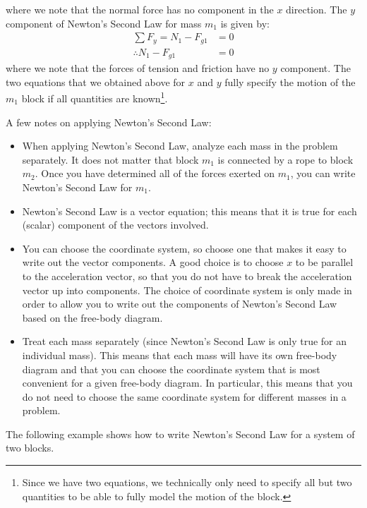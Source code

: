 where we note that the normal force has no component in the $x$ direction. The $y$ component of Newton's Second Law for mass $m_1$ is given by:
\begin{align*}
\sum F_y = N_1-F_{g1}&=0\\
\therefore N_1-F_{g1}&=0
\end{align*}
where we note that the forces of tension and friction have no $y$ component. The two equations that we obtained above for $x$ and $y$ fully specify the motion of the $m_1$ block if all quantities are known\footnote{Since we have two equations, we technically only need to specify all but two quantities to be able to fully model the motion of the block.}.

A few notes on applying Newton's Second Law:
\begin{itemize}
\item When applying Newton's Second Law, analyze each mass in the problem separately. It does not matter that block $m_1$ is connected by a rope to block $m_2$. Once you have determined all of the forces exerted on $m_1$, you can write Newton's Second Law for $m_1$.
\item Newton's Second Law is a vector equation; this means that it is true for each (scalar) component of the vectors involved.
\item You can choose the coordinate system, so choose one that makes it easy to write out the vector components. A good choice is to choose $x$ to be parallel to the acceleration vector, so that you do not have to break the acceleration vector up into components. The choice of coordinate system is only made in order to allow you to write out the components of Newton's Second Law based on the free-body diagram.
\item Treat each mass separately (since Newton's Second Law is only true for an individual mass). This means that each mass will have its own free-body diagram and that you can choose the coordinate system that is most convenient for a given free-body diagram. In particular, this means that you do not need to choose the same coordinate system for different masses in a problem.
\end{itemize}
The following example shows how to write Newton's Second Law for a system of two blocks.

